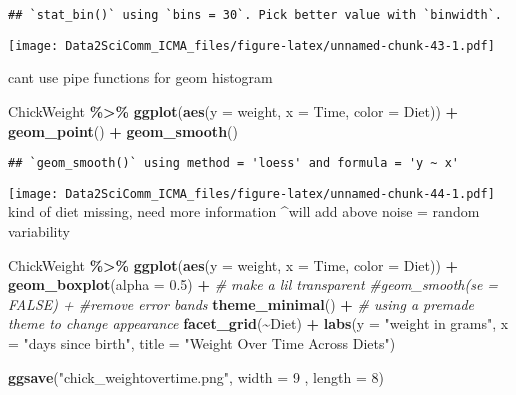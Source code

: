 \documentclass[
]{article}
\newenvironment{Shaded}{\begin{snugshade}}{\end{snugshade}}
\newcommand{\AttributeTok}[1]{\textcolor[rgb]{0.13,0.29,0.53}{#1}}
\newcommand{\CommentTok}[1]{\textcolor[rgb]{0.56,0.35,0.01}{\textit{#1}}}
\newcommand{\DecValTok}[1]{\textcolor[rgb]{0.00,0.00,0.81}{#1}}
\newcommand{\FloatTok}[1]{\textcolor[rgb]{0.00,0.00,0.81}{#1}}
\newcommand{\FunctionTok}[1]{\textcolor[rgb]{0.13,0.29,0.53}{\textbf{#1}}}
\newcommand{\NormalTok}[1]{#1}
\newcommand{\SpecialCharTok}[1]{\textcolor[rgb]{0.81,0.36,0.00}{\textbf{#1}}}
\newcommand{\StringTok}[1]{\textcolor[rgb]{0.31,0.60,0.02}{#1}}
\begin{document}
\begin{verbatim}
## `stat_bin()` using `bins = 30`. Pick better value with `binwidth`.
\end{verbatim}

\texttt{[image: Data2SciComm\_ICMA\_files/figure-latex/unnamed-chunk-43-1.pdf]}

cant use pipe functions for geom histogram

\begin{Shaded}
\begin{Highlighting}[]
\NormalTok{ChickWeight }\SpecialCharTok{\%\textgreater{}\%}
  \FunctionTok{ggplot}\NormalTok{(}\FunctionTok{aes}\NormalTok{(}\AttributeTok{y =}\NormalTok{ weight,}
             \AttributeTok{x =}\NormalTok{ Time,}
             \AttributeTok{color =}\NormalTok{ Diet)) }\SpecialCharTok{+}
  \FunctionTok{geom\_point}\NormalTok{() }\SpecialCharTok{+} \FunctionTok{geom\_smooth}\NormalTok{()}
\end{Highlighting}
\end{Shaded}

\begin{verbatim}
## `geom_smooth()` using method = 'loess' and formula = 'y ~ x'
\end{verbatim}

\texttt{[image: Data2SciComm\_ICMA\_files/figure-latex/unnamed-chunk-44-1.pdf]}
kind of diet missing, need more information \^{}will add above noise =
random variability

\begin{Shaded}
\begin{Highlighting}[]
\NormalTok{ChickWeight }\SpecialCharTok{\%\textgreater{}\%}
  \FunctionTok{ggplot}\NormalTok{(}\FunctionTok{aes}\NormalTok{(}\AttributeTok{y =}\NormalTok{ weight,}
             \AttributeTok{x =}\NormalTok{ Time,}
             \AttributeTok{color =}\NormalTok{ Diet)) }\SpecialCharTok{+}
  \FunctionTok{geom\_boxplot}\NormalTok{(}\AttributeTok{alpha =} \FloatTok{0.5}\NormalTok{) }\SpecialCharTok{+} \CommentTok{\# make a lil transparent}
  \CommentTok{\#geom\_smooth(se = FALSE) + \#remove error bands}
  \FunctionTok{theme\_minimal}\NormalTok{() }\SpecialCharTok{+} \CommentTok{\# using a premade theme to change appearance}
  \FunctionTok{facet\_grid}\NormalTok{(}\SpecialCharTok{\textasciitilde{}}\NormalTok{Diet) }\SpecialCharTok{+}
  \FunctionTok{labs}\NormalTok{(}\AttributeTok{y =} \StringTok{"weight in grams"}\NormalTok{, }
       \AttributeTok{x =} \StringTok{"days since birth"}\NormalTok{,}
       \AttributeTok{title =} \StringTok{"Weight Over Time Across Diets"}\NormalTok{)  }

\FunctionTok{ggsave}\NormalTok{(}\StringTok{"chick\_weightovertime.png"}\NormalTok{, }\AttributeTok{width =} \DecValTok{9}\NormalTok{ , }\AttributeTok{length =} \DecValTok{8}\NormalTok{)}
\end{Highlighting}
\end{Shaded}
\end{document}
